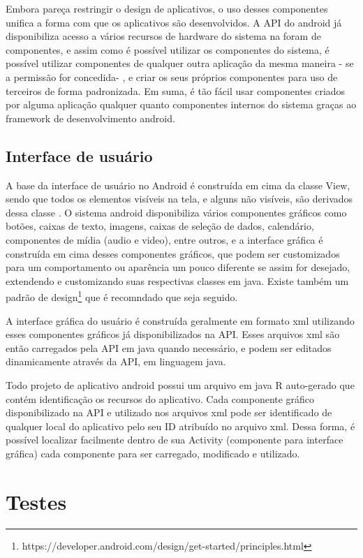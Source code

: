 Embora pareça restringir o design de aplicativos, o uso desses componentes unifica a forma com que os aplicativos são desenvolvidos. A API do android já disponibiliza acesso a vários recursos de hardware do sistema na foram de componentes, e assim como é possível utilizar os componentes do sistema, é possível utilizar componentes de qualquer outra aplicação da mesma maneira - se a permissão for concedida- , e criar os seus próprios componentes para uso de terceiros de forma padronizada. Em suma, é tão fácil usar componentes criados por alguma aplicação qualquer quanto componentes internos do sistema graças ao framework de desenvolvimento android.

\subsection{Interface de usuário}

A base da interface de usuário no Android é construída em cima da classe View, sendo que todos os elementos visíveis na tela, e alguns não visíveis, são derivados dessa classe \cite{androidarch2010}. O sistema android disponibiliza vários componentes gráficos como botões, caixas de texto, imagens, caixas de seleção de dados, calendário, componentes de mídia (audio e video), entre outros, e a interface gráfica é construída em cima desses componentes gráficos, que podem ser customizados para um comportamento ou aparência um pouco diferente se assim for desejado, extendendo e customizando suas respectivas classes em java. Existe também um padrão de design\footnote{https://developer.android.com/design/get-started/principles.html} que é recomndado que seja seguido.

A interface gráfica do usuário é construída geralmente em formato xml utilizando esses componentes gráficos já disponibilizados na API. Esses arquivos xml são então carregados pela API em java quando necessário, e podem ser editados dinamicamente através da API, em linguagem java.

Todo projeto de aplicativo android possui um arquivo em java R auto-gerado que contém identificação os recursos do aplicativo. Cada componente gráfico disponibilizado na API e utilizado nos arquivos xml pode ser identificado de qualquer local do aplicativo pelo seu ID atribuído no arquivo xml. Dessa forma, é possível localizar facilmente dentro de sua Activity (componente para interface gráfica) cada componente para ser carregado, modificado e utilizado.

\section{Testes}

